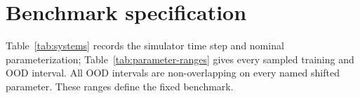 \appendix
\renewcommand{\theHtable}{appendix.\arabic{table}}
\renewcommand{\theHfigure}{appendix.\arabic{figure}}
\renewcommand{\theHequation}{appendix.\arabic{equation}}
\section{Benchmark specification}

Table~\ref{tab:systems} records the simulator time step and nominal
parameterization; Table~\ref{tab:parameter-ranges} gives every sampled training
and OOD interval. All OOD intervals are non-overlapping on every named shifted
parameter. These ranges define the fixed benchmark.

\begin{table}[ht]
\centering
\caption{Controlled-system definitions. $u$ is scalar in every system.}
\label{tab:systems}
\end{table}


